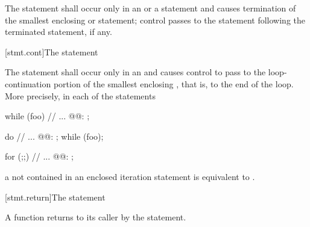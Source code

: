 \pnum
The  statement shall occur only in an
%
%
 or a  statement and causes
termination of the smallest enclosing  or
 statement; control passes to the statement following the
terminated statement, if any.

[stmt.cont]{The  statement}%

\pnum
The
statement shall occur only in an
%
and causes control to pass to the loop-continuation portion of the
smallest enclosing , that is, to the end
of the loop. More precisely, in each of the statements
\begin{minipage}{.30\hsize}
\begin{codeblock}
while (foo) {
  {
    // ...
  }
@@: ;
}
\end{codeblock}
\end{minipage}
\begin{minipage}{.30\hsize}
\begin{codeblock}
do {
  {
    // ...
  }
@@: ;
} while (foo);
\end{codeblock}
\end{minipage}
\begin{minipage}{.30\hsize}
\begin{codeblock}
for (;;) {
  {
    // ...
  }
@@: ;
}
\end{codeblock}
\end{minipage}

a  not contained in an enclosed iteration statement is
equivalent to  .

[stmt.return]{The  statement}%
%
%

\pnum
A function returns to its caller by the  statement.

